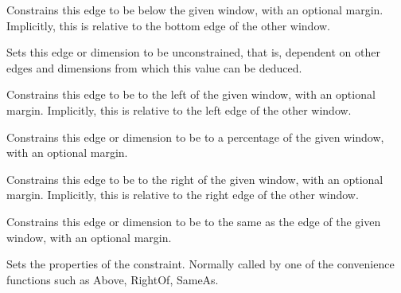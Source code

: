 Constrains this edge to be below the given window, with an
optional margin. Implicitly, this is relative to the bottom edge of the other window.



Sets this edge or dimension to be unconstrained, that is, dependent on
other edges and dimensions from which this value can be deduced.



Constrains this edge to be to the left of the given window, with an
optional margin. Implicitly, this is relative to the left edge of the other window.



Constrains this edge or dimension to be to a percentage of the given window, with an
optional margin.



Constrains this edge to be to the right of the given window, with an
optional margin. Implicitly, this is relative to the right edge of the other window.



Constrains this edge or dimension to be to the same as the edge of the given window, with an
optional margin.



Sets the properties of the constraint. Normally called by one of the convenience
functions such as Above, RightOf, SameAs.


